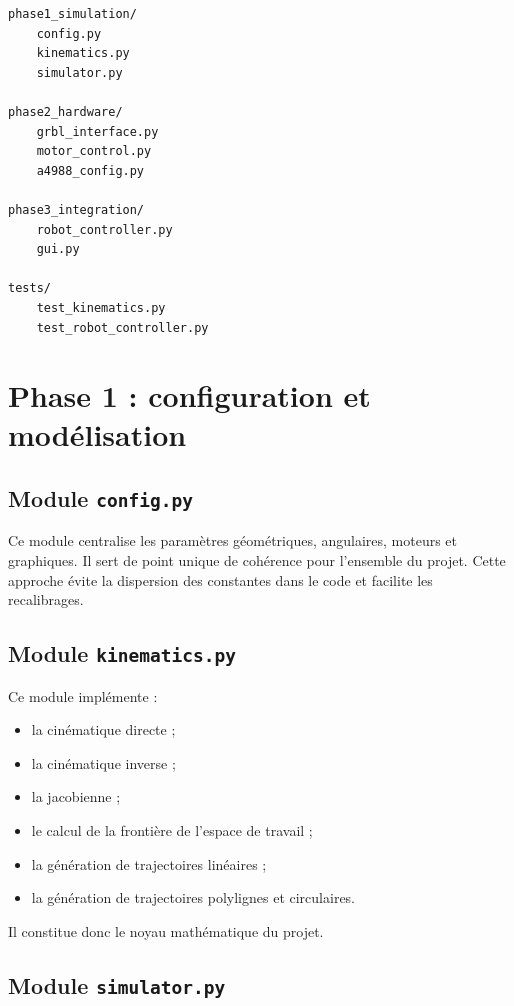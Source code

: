 \documentclass[12pt,a4paper]{report}
\begin{document}
\begin{lstlisting}[style=codestyle,caption={Organisation générale du projet}]
phase1_simulation/
    config.py
    kinematics.py
    simulator.py

phase2_hardware/
    grbl_interface.py
    motor_control.py
    a4988_config.py

phase3_integration/
    robot_controller.py
    gui.py

tests/
    test_kinematics.py
    test_robot_controller.py
\end{lstlisting}

\section{Phase 1 : configuration et modélisation}

\subsection{Module \texttt{config.py}}

Ce module centralise les paramètres géométriques, angulaires, moteurs et graphiques.
Il sert de point unique de cohérence pour l'ensemble du projet. Cette approche évite
la dispersion des constantes dans le code et facilite les recalibrages.

\subsection{Module \texttt{kinematics.py}}

Ce module implémente :

\begin{itemize}
    \item la cinématique directe ;
    \item la cinématique inverse ;
    \item la jacobienne ;
    \item le calcul de la frontière de l'espace de travail ;
    \item la génération de trajectoires linéaires ;
    \item la génération de trajectoires polylignes et circulaires.
\end{itemize}

Il constitue donc le noyau mathématique du projet.

\subsection{Module \texttt{simulator.py}}
\end{document}
